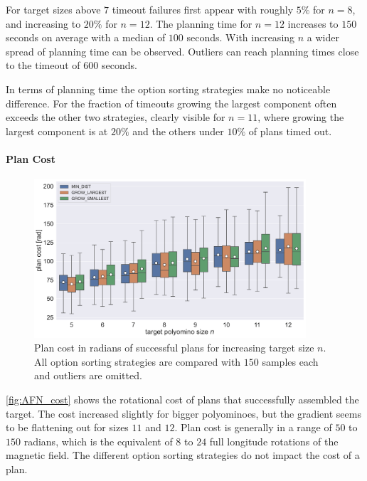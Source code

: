 For target sizes above $7$ timeout failures first appear with roughly $5\%$ for $n = 8$, and increasing to $20\%$ for $n=12$.
The planning time for $n = 12$ increases to $150$ seconds on average with a median of $100$ seconds.
With increasing $n$ a wider spread of planning time can be observed.
Outliers can reach planning times close to the timeout of $600$ seconds.

In terms of planning time the option sorting strategies make no noticeable difference.
For the fraction of timeouts growing the largest component often exceeds the other two strategies, clearly visible for $n=11$, where growing the largest component is at $20\%$ and the others under $10\%$ of plans timed out.


\paragraph{Plan Cost}

\begin{figure}
	\centering
	\includegraphics[width=0.9\textwidth]{figures/plots/AFN_cost.pdf}
	\caption[Plan cost for increasing size]{Plan cost in radians of successful plans for increasing target size $n$. All option sorting strategies are compared with $150$ samples each and outliers are omitted.}
	\label{fig:AFN_cost}
\end{figure}

\autoref{fig:AFN_cost} shows the rotational cost of plans that successfully assembled the target.
The cost increased slightly for bigger polyominoes, but the gradient seems to be flattening out for sizes $11$ and $12$.
Plan cost is generally in a range of $50$ to $150$ radians, which is the equivalent of $8$ to $24$ full longitude rotations of the magnetic field.
The different option sorting strategies do not impact the cost of a plan.

